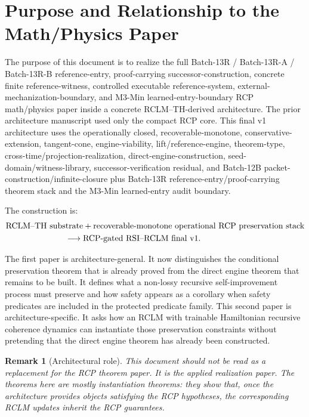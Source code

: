 \documentclass[11pt,a4paper]{article}
\newtheorem{remark}[theorem]{Remark}
\begin{document}
\tableofcontents
\newpage

\section{Purpose and Relationship to the Math/Physics Paper}

The purpose of this document is to realize the full Batch-13R / Batch-13R-A / Batch-13R-B reference-entry, proof-carrying successor-construction, concrete finite reference-witness, controlled executable reference-system, external-mechanization-boundary, and M3-Min learned-entry-boundary RCP math/physics paper inside a concrete RCLM--TH-derived architecture. The prior architecture manuscript used only the compact RCP core. This final v1 architecture uses the operationally closed, recoverable-monotone, conservative-extension, tangent-cone, engine-viability, lift/reference-engine, theorem-type, cross-time/projection-realization, direct-engine-construction, seed-domain/witness-library, successor-verification residual, and Batch-12B packet-construction/infinite-closure plus Batch-13R reference-entry/proof-carrying theorem stack and the M3-Min learned-entry audit boundary.

The construction is:
\[
\begin{aligned}
&\text{RCLM--TH substrate}
+\text{recoverable-monotone operational RCP preservation stack}\\
&\hspace{2.5cm}\longrightarrow\text{RCP-gated RSI--RCLM final v1}.
\end{aligned}
\]

The first paper is architecture-general. It now distinguishes the conditional preservation theorem that is already proved from the direct engine theorem that remains to be built. It defines what a non-lossy recursive self-improvement process must preserve and how safety appears as a corollary when safety predicates are included in the protected predicate family. This second paper is architecture-specific. It asks how an RCLM with trainable Hamiltonian recursive coherence dynamics can instantiate those preservation constraints without pretending that the direct engine theorem has already been constructed.

\begin{remark}[Architectural role]
This document should not be read as a replacement for the RCP theorem paper. It is the applied realization paper. The theorems here are mostly instantiation theorems: they show that, once the architecture provides objects satisfying the RCP hypotheses, the corresponding RCLM updates inherit the RCP guarantees.
\end{remark}
\end{document}
